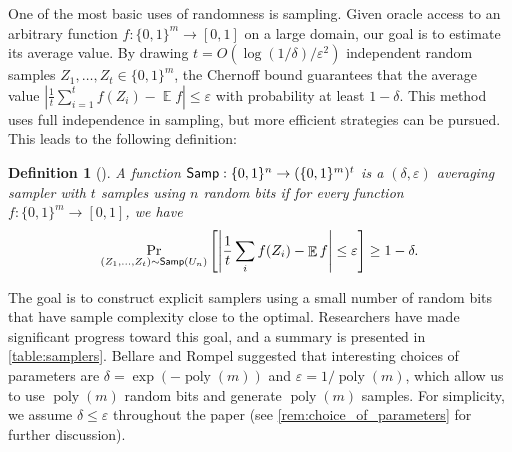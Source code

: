 \documentclass[11pt,letterpaper]{article}
\newtheorem{definition}[theorem]{Definition}
\DeclareMathOperator*{\E}{\mathbb{E}}
\DeclareMathOperator*{\poly}{poly}
\newcommand{\eps}{\varepsilon}
\newcommand{\1}{\mathbbm{1}}
\newcommand{\abs}[1]{\left|#1\right| }
\newcommand{\zo}{\{0, 1\}}
\newcommand{\Smp}{\textup{\textsf{Samp}}}
\begin{document}
One of the most basic uses of randomness is sampling. 
Given oracle access to an arbitrary function $f: \zo^m \to [0, 1]$ on a large domain, our goal is to estimate its average value.
By drawing $t = O(\log(1/\delta)/\eps^2)$ independent random samples $Z_1, \dots, Z_t \in \zo^m$, 
the Chernoff bound guarantees that the average value $\abs{\frac{1}{t} \sum_{i=1}^t f(Z_i) - \E f} \le \eps$ with probability at least $1 - \delta$. This method uses full independence in sampling, but more efficient strategies can be pursued. This leads to the following definition:
\begin{definition}[\cite{bellare1994randomness}]
    A function $\Smp : \zo^n \to (\zo^m)^t$ is a $(\delta, \eps)$ averaging sampler with $t$ samples using $n$ random bits if for every function $f : \zo^m \to [0, 1]$, we have \[
    \Pr_{(Z_1, \dots, Z_t) \sim \Smp(U_n)}
    \left[ \abs{\frac{1}{t}  \sum_i f(Z_i) - \E f} \leq \varepsilon \right]
    \geq 1 - \delta.
    \]
\end{definition}

The goal is to construct explicit samplers using a small number of random bits that have sample complexity close to the optimal. Researchers have made significant progress toward this goal, and a summary is presented in \cref{table:samplers}. 
Bellare and Rompel \cite{bellare1994randomness} suggested that interesting choices of parameters are $\delta = \exp(-\poly(m))$ and $\eps = 1/\poly(m)$, which allow us to use $\poly(m)$ random bits and generate $\poly(m)$ samples.
For simplicity, we assume $\delta \le \eps$ throughout the paper (see \cref{rem:choice_of_parameters} for further discussion).
\end{document}
